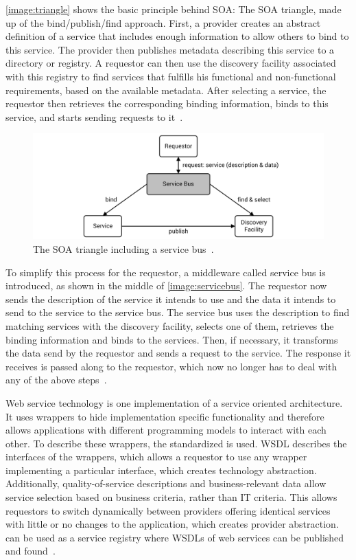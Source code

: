 \autoref{image:triangle} shows the basic principle behind SOA: The SOA triangle, made up of the bind/publish/find approach.
First, a provider creates an abstract definition of a service that includes enough information to allow others to bind to this service.
The provider then publishes metadata describing this service to a directory or registry.
A requestor can then use the discovery facility associated with this registry to find services that fulfills his functional and non-functional requirements, based on the available metadata.
After selecting a service, the requestor then retrieves the corresponding binding information, binds to this service, and starts sending requests to it~\autocite{webservices}.

\begin{figure}[!htbp]
	\centering
	\includegraphics[resolution=600]{fundamentals/assets/service_bus}
	\caption{The SOA triangle including a service bus~\autocite[based on][]{webservices}.}
	\label{image:servicebus}
\end{figure}

To simplify this process for the requestor, a middleware called service bus is introduced, as shown in the middle of \autoref{image:servicebus}.
The requestor now sends the description of the service it intends to use and the data it intends to send to the service to the service bus.
The service bus uses the description to find matching services with the discovery facility, selects one of them, retrieves the binding information and binds to the services.
Then, if necessary, it transforms the data send by the requestor and sends a request to the service.
The response it receives is passed along to the requestor, which now no longer has to deal with any of the above steps~\autocite{webservices}.

Web service technology is one implementation of a service oriented architecture.
It uses wrappers to hide implementation specific functionality and therefore allows applications with different programming models to interact with each other.
To describe these wrappers, the standardized  is used.
WSDL describes the interfaces of the wrappers, which allows a requestor to use any wrapper implementing a particular interface, which creates technology abstraction.
Additionally, quality-of-service descriptions and business-relevant data allow service selection based on business criteria, rather than IT criteria.
This allows requestors to switch dynamically between providers offering identical services with little or no changes to the application, which creates provider abstraction.
 can be used as a service registry where WSDLs of web services can be published and found~\autocite{webservices}.

